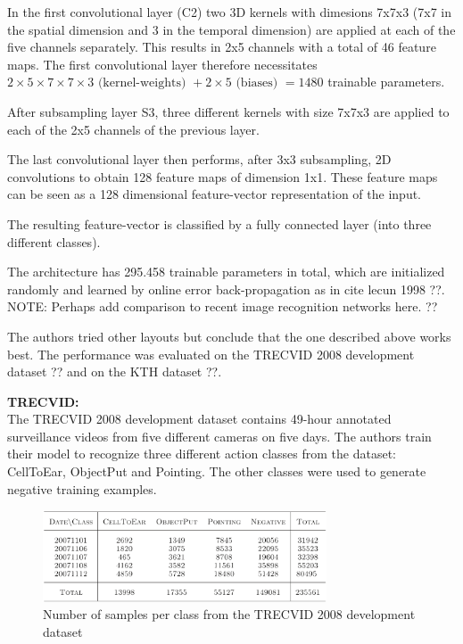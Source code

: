 In the first convolutional layer (C2) two 3D kernels with dimesions 7x7x3 (7x7 in the spatial dimension and 3 in the temporal dimension) are applied at each of the five channels separately. 
This results in 2x5 channels with a total of 46 feature maps.
The first convolutional layer therefore necessitates $2 \times 5 \times 7 \times 7 \times 3 \text{ (kernel-weights) } + 2 \times 5 \text{ (biases) } = 1480$ trainable parameters. 

After subsampling layer S3, three different kernels with size 7x7x3 are applied to each of the 2x5 channels of the previous layer.

The last convolutional layer then performs, after 3x3 subsampling, 2D convolutions to obtain 128 feature maps of dimension 1x1.
These feature maps can be seen as a 128 dimensional feature-vector representation of the input.

The resulting feature-vector is classified by a fully connected layer (into three different classes).

The architecture has 295.458 trainable parameters in total, which are initialized randomly and learned by online error back-propagation as in cite lecun 1998 ??.
NOTE: Perhaps add comparison to recent image recognition networks here. ??

The authors tried other layouts but conclude that the one described above works best. The performance was evaluated on the TRECVID 2008 development dataset ?? and on the KTH dataset ??.

\textbf{TRECVID:}\\
The TRECVID 2008 development dataset contains 49-hour annotated surveillance videos from five different cameras on five days.
The authors train their model to recognize three different action classes from the dataset: CellToEar, ObjectPut and Pointing.
The other classes were used to generate negative training examples.

\begin{figure}[H]
    \centering
    \includegraphics[width=0.75\textwidth]{img_deep/3dconv_dataset}
    \caption{Number of samples per class from the TRECVID 2008 development dataset \cite{ji_3d_2013}}
    \label{fig:3dconv_dataset}
\end{figure}


